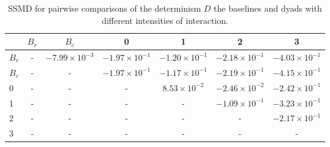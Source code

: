 \begin{table}
\centering
\caption{SSMD for pairwise comparisons of the determinism $D$ the baselines and dyads with different intensities of interaction.}
\label{tab:ssmd_determinism}
\begin{tabular}{lcccccc}
\toprule
 & $B_r$ & $B_c$ & 0 & 1 & 2 & 3 \\
\midrule
$B_r$ & - & $-7.99 \times 10^{-3}$ & $-1.97 \times 10^{-1}$ & $-1.20 \times 10^{-1}$ & $-2.18 \times 10^{-1}$ & $-4.03 \times 10^{-1}$ \\
$B_c$ & - & - & $-1.97 \times 10^{-1}$ & $-1.17 \times 10^{-1}$ & $-2.19 \times 10^{-1}$ & $-4.15 \times 10^{-1}$ \\
0 & - & - & - & $8.53 \times 10^{-2}$ & $-2.46 \times 10^{-2}$ & $-2.42 \times 10^{-1}$ \\
1 & - & - & - & - & $-1.09 \times 10^{-1}$ & $-3.23 \times 10^{-1}$ \\
2 & - & - & - & - & - & $-2.17 \times 10^{-1}$ \\
3 & - & - & - & - & - & - \\
\bottomrule
\end{tabular}
\end{table}
